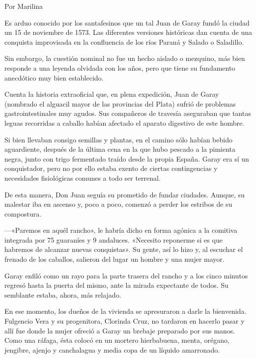 \documentclass[11pt,twoside,openright,a5paper]{book}
\begin{document}
                                          \begin{flushright}Por Marilina\end{flushright}

Es arduo conocido por los santafesinos que un tal Juan de Garay fundó la ciudad un 15 de noviembre de 1573. Las diferentes versiones históricas dan cuenta de una conquista improvisada en la confluencia de los ríos Paraná y Salado o Saladillo.

Sin embargo, la cuestión nominal no fue un hecho aislado o mezquino, más bien responde a una leyenda olvidada con los años, pero que tiene su fundamento anecdótico muy bien establecido.

Cuenta la historia extraoficial que, en plena expedición, Juan de Garay (nombrado el alguacil mayor de las provincias del Plata) sufrió de problemas gastrointestinales muy agudos. Sus compañeros de travesía aseguraban que tantas leguas recorridas a caballo habían afectado el aparato digestivo de este hombre.

Si bien llevaban consigo semillas y plantas, en el camino sólo habían bebido aguardiente, después de la última cena en la que hubo pescado a la pimienta negra, junto con trigo fermentado traído desde la propia España. Garay era sí un conquistador, pero no por ello estaba exento de ciertas contingencias y necesidades fisiológicas comunes a todo ser terrenal.

De esta manera, Don Juan seguía su prometido de fundar ciudades. Aunque, su malestar iba en ascenso y, poco a poco, comenzó a perder los estribos de su compostura. 

---«Paremos en aquél rancho», le habría dicho en forma agónica a la comitiva integrada por 75 guaraníes y 9 andaluces. «Necesito reponerme si es que habremos de alcanzar nuevas conquistas». Su gente, así lo hizo y, al escuchar el frenado de los caballos, salieron del lugar un hombre y una mujer mayor.

Garay enfiló como un rayo para la parte trasera del rancho y a los cinco minutos regresó hasta la puerta del mismo, ante la mirada expectante de todos. Su semblante estaba, ahora, más relajado.

En ese momento, los dueños de la vivienda se apresuraron a darle la bienvenida. Fulgencio Vera y su progenitora, Clorinda Cruz, no tardaron en hacerlo pasar y allí fue donde la mujer ofreció a Garay un brebaje preparado por sus manos. Como una ráfaga, ésta colocó en un mortero hierbabuena, menta, orégano, jengibre, ajenjo y canchalagua y media copa de un líquido amarronado. 
\end{document}
